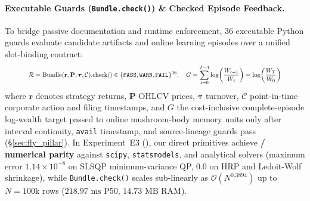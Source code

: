\paragraph{Executable Guards (\texttt{Bundle.check()}) \& Checked Episode Feedback.}
To bridge passive documentation and runtime enforcement, 36 executable Python guards evaluate candidate artifacts and online learning episodes over a unified slot-binding contract:
\begin{equation}
\resizebox{0.88\columnwidth}{!}{$\displaystyle \mathcal{R} = \text{Bundle}(\mathbf{r}, \mathbf{P}, \boldsymbol{\tau}, \mathcal{C}).\text{check}() \in \{\texttt{PASS}, \texttt{WARN}, \texttt{FAIL}\}^{36},\quad G = \sum_{t=0}^{T-1}\log\!\left(\frac{W_{t+1}}{W_t}\right) = \log\!\left(\frac{W_T}{W_0}\right)$}
\end{equation}
where $\mathbf{r}$ denotes strategy returns, $\mathbf{P}$ OHLCV prices, $\boldsymbol{\tau}$ turnover, $\mathcal{C}$ point-in-time corporate action and filing timestamps, and $G$ the cost-inclusive complete-episode log-wealth target passed to online mushroom-body memory units \citep{huang2024memory} only after interval continuity, \texttt{avail} timestamp, and source-lineage guards pass (\S\ref{sec:fly_pillar}). In Experiment~E3 (), our direct primitives achieve \textbf{\ParityPassed{}/\ParityTotal{} numerical parity} against \texttt{scipy}, \texttt{statsmodels}, and analytical solvers (maximum error $1.14\times 10^{-8}$ on SLSQP minimum-variance QP, $0.0$ on HRP and Ledoit-Wolf shrinkage), while \texttt{Bundle.check()} scales sub-linearly as $\mathcal{O}(N^{0.3894})$ up to $N=100\text{k}$ rows ($218.97\text{ ms}$ P50, $14.73\text{ MB}$ RAM).

